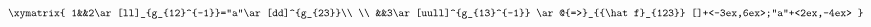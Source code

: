\begin{equation}
\begin{aligned}
\xymatrix{
  1&&2\ar[ll]_{g_{12}^{-1}}="a"\ar[dd]^{g_{23}}\\
  \\
  &&3\ar[uull]^{g_{13}^{-1}}
  \ar@{=>}_{{\hat f}_{123}} []+<-3ex,6ex>;"a"+<2ex,-4ex>
}
\end{aligned}
\end{equation}

